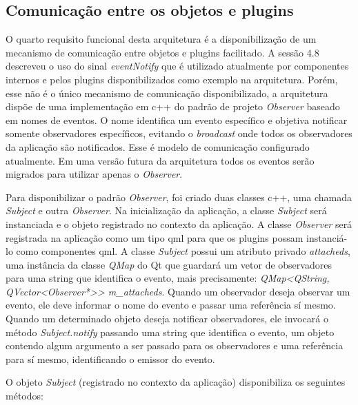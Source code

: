\subsection{Comunicação entre os objetos e plugins}
O quarto requisito funcional desta arquitetura é a disponibilização de um mecanismo de comunicação entre objetos e plugins facilitado. A sessão 4.8 descreveu o uso do sinal \textit{eventNotify} que é utilizado atualmente por componentes internos e pelos plugins disponibilizados como exemplo na arquitetura. Porém, esse não é o único mecanismo de comunicação disponibilizado, a arquitetura dispõe de uma implementação em c++ do padrão de projeto \textit{Observer} baseado em nomes de eventos. O nome identifica um evento específico e objetiva notificar somente observadores específicos, evitando o \textit{broadcast} onde todos os observadores da aplicação são notificados. Esse é modelo de comunicação configurado atualmente. Em uma versão futura da arquitetura todos os eventos serão migrados para utilizar apenas o \textit{Observer}.\par

Para disponibilizar o padrão \textit{Observer}, foi criado duas classes c++, uma chamada \textit{Subject} e outra \textit{Observer}. Na inicialização da aplicação, a classe \textit{Subject} será instanciada e o objeto registrado no contexto da aplicação. A classe \textit{Observer} será registrada na aplicação como um tipo qml para que os plugins possam instanciá-lo como componentes qml. A classe \textit{Subject} possui um atributo privado \textit{attacheds}, uma instância da classe \textit{QMap} do Qt que guardará um vetor de observadores para uma string que identifica o evento, mais precisamente: \textit{QMap<QString, QVector<Observer*>> m\_attacheds}. Quando um observador deseja observar um evento, ele deve informar o nome do evento e passar uma referência sí mesmo. Quando um determinado objeto deseja notificar observadores, ele invocará o método \textit{Subject.notify} passando uma string que identifica o evento, um objeto contendo algum argumento a ser passado para os observadores e uma referência para sí mesmo, identificando o emissor do evento.

O objeto \textit{Subject} (registrado no contexto da aplicação) disponibiliza os seguintes métodos:

